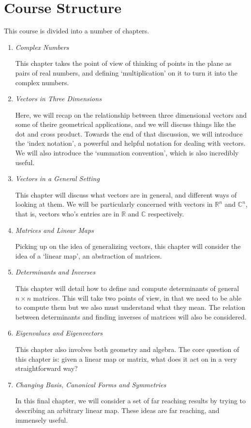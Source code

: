 \documentclass[a4]{scrreprt}
\begin{document}
\section{Course Structure}

This course is divided into a number of chapters.

\begin{enumerate}
	\item \emph{Complex Numbers}

	This chapter takes the point of view of thinking of points in the plane as pairs of real numbers, and defining `multiplication' on it to turn it into the complex numbers.

	\item \emph{Vectors in Three Dimensions}
	
	Here, we will recap on the relationship between three dimensional vectors and some of theire geometrical applications, and we will discuss things like the dot and cross product. Towards the end of that discussion, we will introduce the `index notation', a powerful and helpful notation for dealing with vectors. We will also introduce the `summation convention', which is also incredibly useful.

	\item \emph{Vectors in a General Setting}
	
	This chapter will discuss what vectors are in general, and different ways of looking at them. We will be particularly concerned with vectors in $\mathbb{R}^n$ and $\mathbb{C}^n$, that is, vectors who's entries are in $\mathbb{R}$ and $\mathbb{C}$ respectively.

	\item \emph{Matrices and Linear Maps}
	
	Picking up on the idea of generalizing vectors, this chapter will consider the idea of a `linear map', an abstraction of matrices. 

	\item \emph{Determinants and Inverses}
	
	This chapter will detail how to define and compute determinants of general $n \times n$ matrices. This will take two points of view, in that we need to be able to compute them but we also must understand what they mean. The relation between determinants and finding inverses of matrices will also be considered.

	\item \emph{Eigenvalues and Eigenvectors}
	
	This chapter also involves both geometry and algebra. The core question of this chapter is: given a linear map or matrix, what does it act on in a very straightforward way?

	\item \emph{Changing Basis, Canonical Forms and Symmetries}
	
	In this final chapter, we will consider a set of far reaching results by trying to describing an arbitrary linear map. These ideas are far reaching, and immensely useful.
\end{enumerate}
\end{document}
